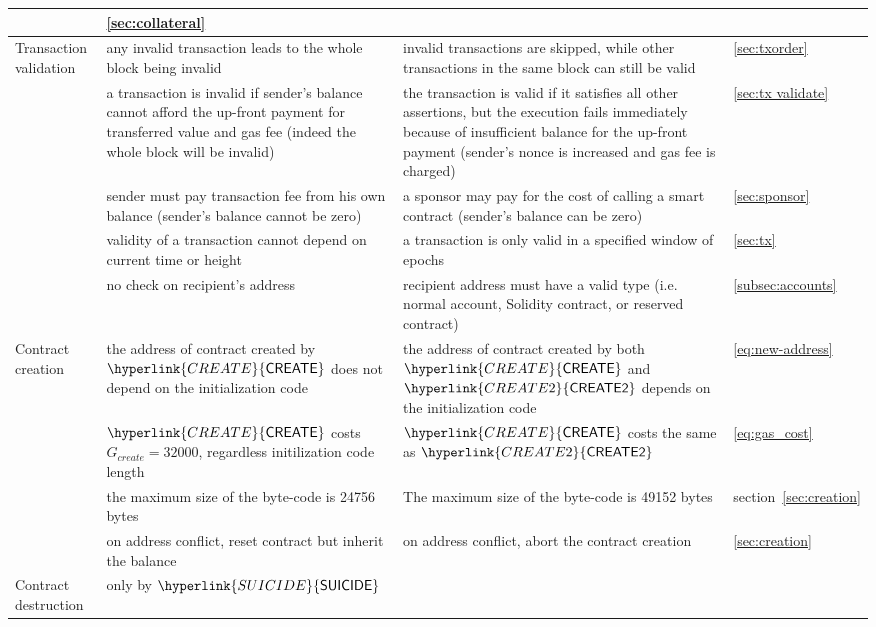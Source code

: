 \begin{center}
\begin{tabu}{l X X l}
			& \cref{sec:collateral}\\
			\hline
			Transaction validation & 
			{any invalid transaction leads to the whole block being invalid} & 
			{invalid transactions are skipped, while other transactions in the same block can still be valid} & \cref{sec:txorder}\smallskip\\
			& {a transaction is invalid if sender's balance cannot afford the up-front payment for transferred value and gas fee (indeed the whole block will be invalid)} & {the transaction is valid if it satisfies all other assertions, but the execution fails immediately because of insufficient balance for the up-front payment (sender's nonce is increased and gas fee is charged)}	& \cref{sec:tx validate} \\
			& sender must pay transaction fee from his own balance (sender's balance cannot be zero)	& a sponsor may pay for the cost of calling a smart contract (sender's balance can be zero)	& \cref{sec:sponsor} \\
			& validity of a transaction cannot depend on current time or height & a transaction is only valid in a specified window of epochs & \cref{sec:tx} \\
			& no check on recipient's address & recipient address must have a valid type (i.e. normal account, Solidity contract, or reserved contract)  & \cref{subsec:accounts} \\
			\hline
			Contract creation & the address of contract created by $\hyperlink{CREATE}{\op{CREATE}}$ does not depend on the initialization code  &  the address of contract created by both $\hyperlink{CREATE}{\op{CREATE}}$ and $\hyperlink{CREATE2}{\op{CREATE2}}$ depends on the initialization code &  \cref{eq:new-address} \\
			 & 
			$\hyperlink{CREATE}{\op{CREATE}}$ costs $G_{create}=32000$, regardless initilization code length	
			& $\hyperlink{CREATE}{\op{CREATE}}$ costs the same as $\hyperlink{CREATE2}{\op{CREATE2}}$  & \cref{eq:gas_cost} \\
			& the maximum size of the byte-code is 24756 bytes & The maximum size of the byte-code is 49152 bytes & section~\ref{sec:creation}\\
			& on address conflict, reset contract but inherit the balance &  
			on address conflict, abort the contract creation   
			& \cref{sec:creation}  \smallskip\\
			\hline
			Contract destruction & only by $\hyperlink{SUICIDE}{\op{SUICIDE}}$ & 

\end{tabu}
\end{center}
